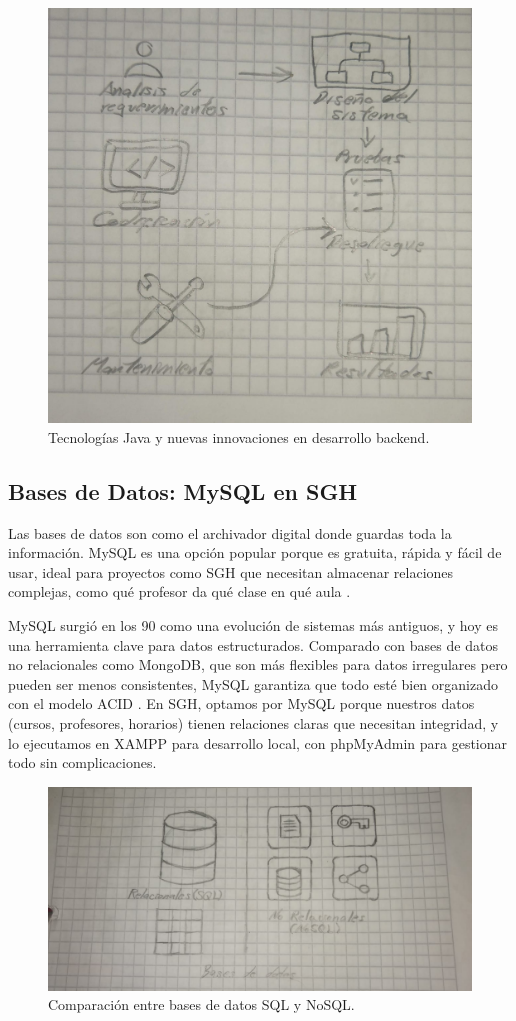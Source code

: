 \begin{figure}[h]
\centering
\includegraphics[width=0.8\columnwidth]{graphics/java-nuevas-tecnologias.png}
\caption{Tecnologías Java y nuevas innovaciones en desarrollo backend.}
\label{fig:java_tecnologias}
\end{figure}

\subsection{Bases de Datos: MySQL en SGH}
Las bases de datos son como el archivador digital donde guardas toda la información. MySQL es una opción popular porque es gratuita, rápida y fácil de usar, ideal para proyectos como SGH que necesitan almacenar relaciones complejas, como qué profesor da qué clase en qué aula \cite{lozano2018}.

MySQL surgió en los 90 como una evolución de sistemas más antiguos, y hoy es una herramienta clave para datos estructurados. Comparado con bases de datos no relacionales como MongoDB, que son más flexibles para datos irregulares pero pueden ser menos consistentes, MySQL garantiza que todo esté bien organizado con el modelo ACID \cite{saltos2022}. En SGH, optamos por MySQL porque nuestros datos (cursos, profesores, horarios) tienen relaciones claras que necesitan integridad, y lo ejecutamos en XAMPP para desarrollo local, con phpMyAdmin para gestionar todo sin complicaciones.

\begin{figure}[h]
\centering
\includegraphics[width=0.8\columnwidth]{graphics/bases-de-datos-sql-y.nosql.png}
\caption{Comparación entre bases de datos SQL y NoSQL.}
\label{fig:bases_datos}
\end{figure}

